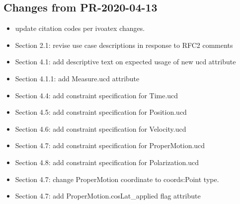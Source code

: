 \documentclass[11pt,a4paper]{ivoa}
\begin{document}
\subsection{Changes from PR-2020-04-13}
\begin{itemize} 
  \item update citation codes per ivoatex changes.
  \item Section 2.1: revise use case descriptions in response to RFC2 comments
  \item Section 4.1: add descriptive text on expected usage of new ucd attribute
  \item Section 4.1.1: add Measure.ucd attribute
  \item Section 4.4: add constraint specification for Time.ucd
  \item Section 4.5: add constraint specification for Position.ucd
  \item Section 4.6: add constraint specification for Velocity.ucd
  \item Section 4.7: add constraint specification for ProperMotion.ucd
  \item Section 4.8: add constraint specification for Polarization.ucd
  \item Section 4.7: change ProperMotion coordinate to coords:Point type.
  \item Section 4.7: add ProperMotion.cosLat\_applied flag attribute
\end{itemize}





\pagebreak

\end{document}
